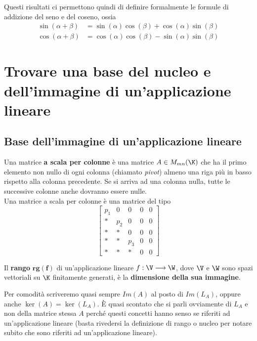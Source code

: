 \documentclass[11pt, a4paper, titlepage, oneside]{scrbook}
\begin{document}
Questi risultati ci permettono quindi di definire formalmente le formule di addizione del seno e del coseno, ossia
\begin{align*}
\sin(\alpha + \beta) &= \sin(\alpha) \cos(\beta) + \cos(\alpha) \sin(\beta) \\
\cos(\alpha + \beta) &= \cos(\alpha)  \cos(\beta) - \sin(\alpha)\sin(\beta) 
\end{align*}

\section{Trovare una base del nucleo e dell'immagine di un'applicazione lineare}

\subsection{Base dell'immagine di un'applicazione lineare}

\begin{Definizione}
\label{def-matrice-scala-per-colonne}
Una matrice \textbf{a scala per colonne} è una matrice $A \in M_{mn}(\K)$ che ha il primo elemento non nullo di ogni colonna (chiamato \textit{pivot}) almeno una riga più in basso rispetto alla colonna precedente. Se si arriva ad una colonna nulla, tutte le successive colonne anche dovranno essere nulle. \\
Una matrice a scala per colonne è una matrice del tipo
\[
\begin{bmatrix}
p_1 & 0 & 0 & 0 & 0  \\
* & p_2 & 0 & 0 & 0 \\
* & * & 0 & 0 & 0 \\
* & * & p_3 & 0 & 0 \\
* & * & * & 0 & 0 
\end{bmatrix}
\]
\end{Definizione}

\begin{Definizione}[Rango]
\label{def-rango}
Il \textbf{rango} $\bm{rg(f)}$ di un'applicazione lineare $f:\V \longrightarrow \W$, dove $\V$ e $\W$ sono spazi vettoriali su $\K$ finitamente generati, è la \textbf{dimensione della sua immagine}.
\end{Definizione}

\NB Per comodità scriveremo quasi sempre $Im(A)$ al posto di $Im(L_A)$, oppure anche $\ker (A) = \ker (L_A)$. È quasi scontato che si parli ovviamente di $L_A$ e non della matrice stessa $A$ perché questi concetti hanno senso se riferiti ad un'applicazione lineare (basta rivedersi la definizione di rango o nucleo per notare subito che sono riferiti ad un'applicazione lineare).  
\end{document}
